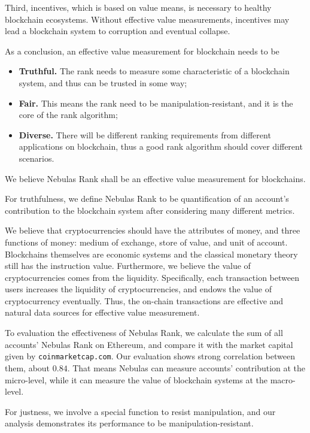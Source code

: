 Third, incentives, which is based on value means, is necessary to healthy blockchain ecosystems. Without effective value measurements, incentives may lead a blockchain system to corruption and eventual collapse.

As a conclusion, an effective value measurement for blockchain needs to be
\begin{itemize}
\item{\textbf{Truthful.}} The rank needs to measure some characteristic of a blockchain system, and thus can be trusted in some way;
\item{\textbf{Fair.}} This means the rank need to be manipulation-resistant, and it is the core of the rank algorithm;
\item{\textbf{Diverse.}} There will be different ranking requirements from different applications on blockchain, thus a good rank algorithm should cover different scenarios.
\end{itemize}

We believe Nebulas Rank shall be an effective value measurement for
blockchains.

For truthfulness, we define Nebulas Rank to be quantification of an account's
contribution to the blockchain system after considering many different
metrics.

We believe that cryptocurrencies should have the attributes of money, and
three functions of money: medium of exchange, store of value, and unit of
account. Blockchains themselves are economic systems and the classical monetary theory still has the instruction value. Furthermore, we believe the value of cryptocurrencies comes from the liquidity. Specifically, each transaction between users increases the liquidity of cryptocurrencies, and endows the value of cryptocurrency eventually. Thus, the on-chain transactions are effective and natural data sources for effective value measurement.


To evaluation the effectiveness of Nebulas Rank, we calculate the sum of all
accounts' Nebulas Rank on Ethereum, and compare it with the market capital
given by \texttt{coinmarketcap.com}. Our evaluation shows strong
correlation between them, about $0.84$. That means Nebulas can measure
accounts' contribution at the micro-level, while it can measure the
value of blockchain systems at the macro-level.

For justness, we involve a special function to resist manipulation, and our analysis demonstrates its performance to be manipulation-resistant.


